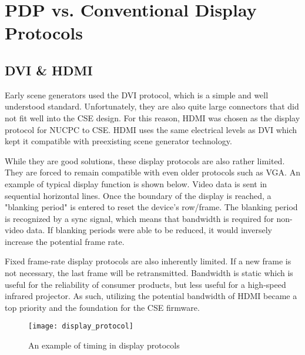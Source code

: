 %
%
\chapter{PDP vs. Conventional Display Protocols}
\section{DVI \& HDMI}
Early scene generators used the DVI protocol, which is a simple and well understood standard. Unfortunately, they are also quite large connectors that did not fit well into the CSE design. For this reason, HDMI was chosen as the display protocol for NUCPC to CSE. HDMI uses the same electrical levels as DVI which kept it compatible with preexisting scene generator technology. \par
While they are good solutions, these display protocols are also rather limited. They are forced to remain compatible with even older protocols such as VGA. An example of typical display function is shown below. Video data is sent in sequential horizontal lines. Once the boundary of the display is reached, a "blanking period" is entered to reset the device's row/frame. The blanking period is recognized by a sync signal, which means that bandwidth is required for non-video data. If blanking periods were able to be reduced, it would inversely increase the potential frame rate. \par
Fixed frame-rate display protocols are also inherently limited. If a new frame is not necessary, the last frame will be retransmitted. Bandwidth is static which is useful for the reliability of consumer products, but less useful for a high-speed infrared projector. As such, utilizing the potential bandwidth of HDMI became a top priority and the foundation for the CSE firmware. 
\begin{figure}[h]
\texttt{[image: display\_protocol]}
\centering
\caption{An example of timing in display protocols}
\centering
\end{figure}
